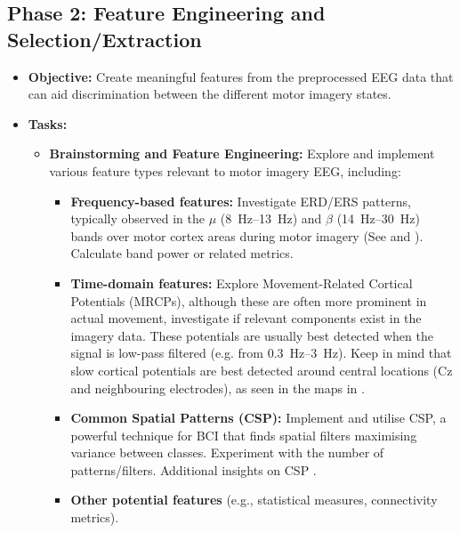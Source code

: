 \documentclass[11pt]{exam}
\begin{document}
    \subsection{Phase 2: Feature Engineering and Selection/Extraction}
    \begin{itemize}
        \item \textbf{Objective:} Create meaningful features from the preprocessed EEG data that can aid discrimination between the different motor imagery states.
        \item \textbf{Tasks:}
        \begin{itemize}
            \item \textbf{Brainstorming and Feature Engineering:} Explore and implement various feature types relevant to motor imagery EEG, including:
            \begin{itemize}
                \item \textbf{Frequency-based features:} Investigate ERD/ERS patterns, typically observed in the \(\mu\) (\SIrange{8}{13}{\hertz}) and \(\beta\) (\SIrange{14}{30}{\hertz}) bands over motor cortex areas during motor imagery (See  and ). Calculate band power or related metrics.
                \item \textbf{Time-domain features:} Explore Movement-Related Cortical Potentials (MRCPs), although these are often more prominent in actual movement, investigate if relevant components exist in the imagery data. These potentials are usually best detected when the signal is low-pass filtered (e.g. from \SIrange{0.3}{3}{\hertz}). Keep in mind that slow cortical potentials are best detected around central locations (Cz and neighbouring electrodes), as seen in the maps in .
                \item \textbf{Common Spatial Patterns (CSP):} Implement and utilise CSP, a powerful technique for BCI that finds spatial filters maximising variance between classes. Experiment with the number of patterns/filters. Additional insights on CSP \href{https://doi.org/10.1109/MSP.2008.4408441}{}.
                \item \textbf{Other potential features} (e.g., statistical measures, connectivity metrics).
            \end{itemize}


\end{itemize}
\end{itemize}
\end{document}
